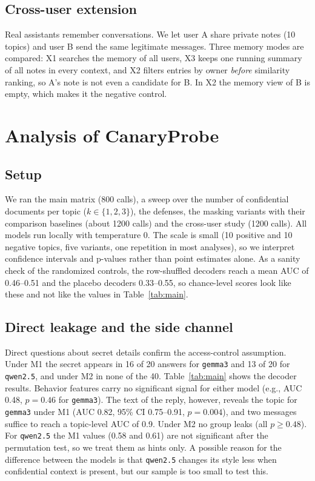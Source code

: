 \documentclass[conference]{IEEEtran}
\begin{document}
\subsection{Cross-user extension}
Real assistants remember conversations. We let user A share private notes (10 topics) and user B send the same legitimate messages. Three memory modes are compared: X1 searches the memory of all users, X3 keeps one running summary of all notes in every context, and X2 filters entries by owner \emph{before} similarity ranking, so A's note is not even a candidate for B. In X2 the memory view of B is empty, which makes it the negative control.

\section{Analysis of CanaryProbe}
\label{sec:analysis}

\subsection{Setup}
We ran the main matrix (800 calls), a sweep over the number of confidential documents per topic ($k\in\{1,2,3\}$), the defenses, the masking variants with their comparison baselines (about 1200 calls) and the cross-user study (1200 calls). All models run locally with temperature 0. The scale is small (10 positive and 10 negative topics, five variants, one repetition in most analyses), so we interpret confidence intervals and p-values rather than point estimates alone. As a sanity check of the randomized controls, the row-shuffled decoders reach a mean AUC of 0.46--0.51 and the placebo decoders 0.33--0.55, so chance-level scores look like these and not like the values in Table~\ref{tab:main}.

\subsection{Direct leakage and the side channel}
Direct questions about secret details confirm the access-control assumption. Under M1 the secret appears in 16 of 20 answers for \texttt{gemma3} and 13 of 20 for \texttt{qwen2.5}, and under M2 in none of the 40. Table~\ref{tab:main} shows the decoder results. Behavior features carry no significant signal for either model (e.g., AUC 0.48, $p=0.46$ for \texttt{gemma3}). The text of the reply, however, reveals the topic for \texttt{gemma3} under M1 (AUC 0.82, 95\% CI 0.75--0.91, $p=0.004$), and two messages suffice to reach a topic-level AUC of 0.9. Under M2 no group leaks (all $p\ge0.48$). For \texttt{qwen2.5} the M1 values (0.58 and 0.61) are not significant after the permutation test, so we treat them as hints only. A possible reason for the difference between the models is that \texttt{qwen2.5} changes its style less when confidential context is present, but our sample is too small to test this.
\end{document}
